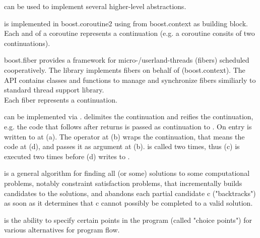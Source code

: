 
\cc can be used to implement several higher-level abstractions.



is implemented in boost.coroutine2\cite{bcoroutine2} using \cc from
boost.context\cite{bcontext} as building block. Each  and
 of a coroutine represents a continuation (e.g. a coroutine
consits of two continuations).



boost.fiber\cite{bfiber} provides a framework for micro-/userland-threads
(fibers) scheduled cooperatively. The library implements fibers on behalf of \cc
(boost.context\cite{bcontext}). The API contains classes and functions to manage
and synchronize fibers similiarly to standard thread support library.\\
Each fiber represents a continuation.



can be implemented via \cc.  delimites the continuation and
 reifies the continuation, e.g. the code that follows after
 returns is passed as continuation to . On entry 
is written to  at (a). The  operator at (b) wraps the
continuation, that means the code at (d), and passes it as argument 
at (b).  is called two times, thus (c) is executed two times before
(d) writes  to .



is a general algorithm for finding all (or some) solutions to some computational problems, notably constraint satisfaction problems, that incrementally builds candidates to the solutions, and abandons each partial candidate c ("backtracks") as soon as it determines that c cannot possibly be completed to a valid solution.

is the ability to specify certain points in the program (called "choice points") for various alternatives for program flow.
